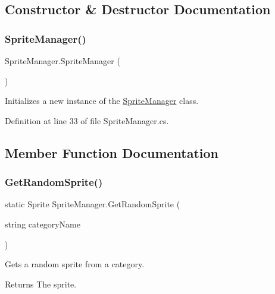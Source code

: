 \subsection{Constructor \& Destructor Documentation}
\mbox{\label{class_sprite_manager_a2bd7ba7f252b047b5c606a89e7a27d01}} 
\subsubsection{\texorpdfstring{Sprite\+Manager()}{SpriteManager()}}
{\footnotesize\ttfamily Sprite\+Manager.\+Sprite\+Manager (\begin{DoxyParamCaption}{ }\end{DoxyParamCaption})}



Initializes a new instance of the \hyperlink{class_sprite_manager}{Sprite\+Manager} class. 



Definition at line 33 of file Sprite\+Manager.\+cs.



\subsection{Member Function Documentation}
\mbox{\label{class_sprite_manager_afad870a040301dad12012508ed1f4fa4}} 
\subsubsection{\texorpdfstring{Get\+Random\+Sprite()}{GetRandomSprite()}}
{\footnotesize\ttfamily static Sprite Sprite\+Manager.\+Get\+Random\+Sprite (\begin{DoxyParamCaption}\item[{string}]{category\+Name }\end{DoxyParamCaption})\hspace{0.3cm}{\ttfamily [static]}}



Gets a random sprite from a category. 

\begin{DoxyReturn}{Returns}
The sprite.
\end{DoxyReturn}

